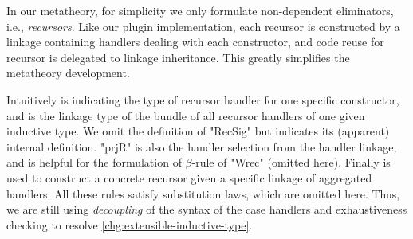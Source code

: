 In our metatheory, for simplicity we only formulate non-dependent eliminators, i.e.,
\textit{recursors}.
Like our plugin implementation, each recursor is constructed by a
linkage containing handlers dealing with each constructor, and code
reuse for recursor is delegated to linkage inheritance.
This greatly simplifies the metatheory development.

Intuitively  is indicating the type of recursor handler
for one specific constructor, and  is the linkage type
of the bundle of all recursor handlers of one given inductive type. We
omit the definition of "RecSig" but  indicates its
(apparent) internal definition. "prjR" is also the handler selection
from the handler linkage, and is helpful for the formulation of
$\beta$-rule of "Wrec" (omitted here). Finally  is
used to construct a concrete recursor given a specific linkage of aggregated
handlers. All these rules satisfy substitution laws, which are omitted here.
Thus, we are still using \textit{decoupling} of the syntax of the case
handlers and exhaustiveness checking to resolve
\ref{chg:extensible-inductive-type}. 

